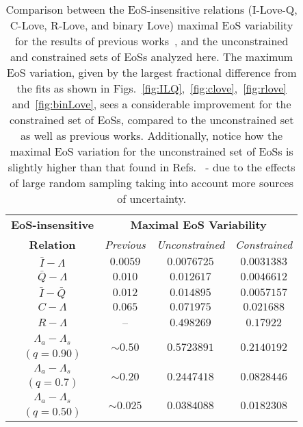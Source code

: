 \documentclass[prd,twocolumn,nofootinbib,superscriptaddress,amsmath,amssymb]{revtex4-1}
\begin{document}
\begin{table}
\centering
\caption{
Comparison between the EoS-insensitive relations (I-Love-Q, C-Love, R-Love, and binary Love) maximal EoS variability for the results of previous works~\cite{Yagi:ILQ,Yagi:binLove}, and the unconstrained and constrained sets of EoSs analyzed here. 
The maximum EoS variation, given by the largest fractional difference from the fits as shown in Figs.~\ref{fig:ILQ},~\ref{fig:clove},~\ref{fig:rlove} and~\ref{fig:binLove}, sees a considerable improvement for the constrained set of EoSs, compared to the unconstrained set as well as previous works.
Additionally, notice how the maximal EoS variation for the unconstrained set of EoSs is slightly higher than that found in Refs.~\cite{Yagi:ILQ,Yagi:binLove} - due to the effects of large random sampling taking into account more sources of uncertainty.
}\label{tab:maxVar}
\begin{tabular}{ c  || c c c } 
 \hline
 \hline
 \textbf{EoS-insensitive} & \multicolumn{3}{c}{\textbf{Maximal EoS Variability}} \\
 \cline{2-4}
 \textbf{Relation} & \multicolumn{1}{c|}{\emph{Previous}} & \multicolumn{1}{c|}{\emph{Unconstrained}} & \emph{Constrained}\\
 \hline
 $\bar{I}-\Lambda$ &  $0.0059$ & $0.0076725$ & $0.0031383$\\
 $\bar{Q}-\Lambda$ & $0.010$ & $0.012617$ & $0.0046612$\\
 $\bar{I}-\bar{Q}$ & $0.012$ & $0.014895$ & $0.0057157$\\
 \hline
 $C-\Lambda$ & $0.065$ & $0.071975$ & $0.021688$\\
 $R-\Lambda$ & -- & $0.498269$ & $0.17922$\\
 \hline
 $\Lambda_a-\Lambda_s$ & \multirow{2}{*}{$\sim0.50$} & \multirow{2}{*}{$0.5723891$} & \multirow{2}{*}{$0.2140192$}\\
 $(q=0.90)$ & & &\\
 \cline{1-1}
 $\Lambda_a-\Lambda_s$ & \multirow{2}{*}{$\sim0.20$} & \multirow{2}{*}{$0.2447418$} & \multirow{2}{*}{$0.0828446$}\\
  $(q=0.7)$ & & &\\
  \cline{1-1}
 $\Lambda_a-\Lambda_s$ & \multirow{2}{*}{$\sim0.025$} & \multirow{2}{*}{$0.0384088$} & \multirow{2}{*}{$0.0182308$}\\
  $(q=0.50)$ & & &\\
  \cline{1-1}
\hline
\hline
\end{tabular}
\end{table}
\end{document}
